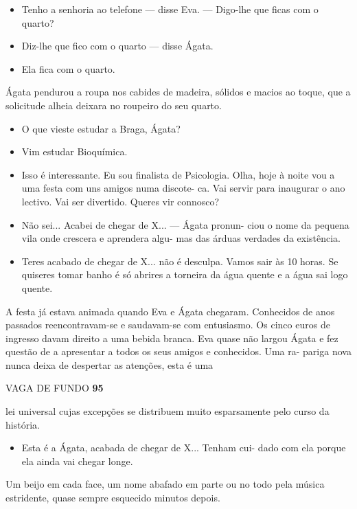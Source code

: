\begin{itemize}
\tightlist
\item
  Tenho a senhoria ao telefone --- disse Eva. --- Digo-lhe que ficas com
  o quarto?
\item
  Diz-lhe que fico com o quarto --- disse Ágata.
\item
  Ela fica com o quarto.
\end{itemize}

Ágata pendurou a roupa nos cabides de madeira, sólidos e macios ao
toque, que a solicitude alheia deixara no roupeiro do seu quarto.

\begin{itemize}
\tightlist
\item
  O que vieste estudar a Braga, Ágata?
\item
  Vim estudar Bioquímica.
\item
  Isso é interessante. Eu sou finalista de Psicologia. Olha, hoje à
  noite vou a uma festa com uns amigos numa discote- ca. Vai servir para
  inaugurar o ano lectivo. Vai ser divertido. Queres vir connosco?
\item
  Não sei... Acabei de chegar de X... --- Ágata pronun- ciou o nome da
  pequena vila onde crescera e aprendera algu- mas das árduas verdades
  da existência.
\item
  Teres acabado de chegar de X... não é desculpa. Vamos sair às 10
  horas. Se quiseres tomar banho é só abrires a torneira da água quente
  e a água sai logo quente.
\end{itemize}

A festa já estava animada quando Eva e Ágata chegaram. Conhecidos de
anos passados reencontravam-se e saudavam-se com entusiasmo. Os cinco
euros de ingresso davam direito a uma bebida branca. Eva quase não
largou Ágata e fez questão de a apresentar a todos os seus amigos e
conhecidos. Uma ra- pariga nova nunca deixa de despertar as atenções,
esta é uma

VAGA DE FUNDO \textbf{95}

lei universal cujas excepções se distribuem muito esparsamente pelo
curso da história.

\begin{itemize}
\tightlist
\item
  Esta é a Ágata, acabada de chegar de X... Tenham cui- dado com ela
  porque ela ainda vai chegar longe.
\end{itemize}

Um beijo em cada face, um nome abafado em parte ou no todo pela música
estridente, quase sempre esquecido minutos depois.

